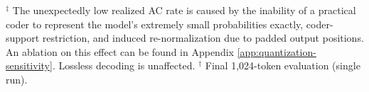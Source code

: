 \begin{table}[h]
\parbox{\linewidth}{\scriptsize
$^\ddagger$ The unexpectedly low realized AC rate is caused by the inability of a practical coder to represent the model’s extremely small probabilities exactly, coder-support restriction, and induced re-normalization due to padded output positions. An ablation on this effect can be found in Appendix \ref{app:quantization-sensitivity}. Lossless decoding is unaffected. $^\dagger$ Final 1,024-token evaluation (single run).
}

\end{table}